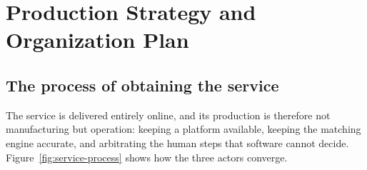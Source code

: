 \chapter{Production Strategy and Organization Plan}
\label{ch:organization}

\section{The process of obtaining the service}

The service is delivered entirely online, and its production is therefore not
manufacturing but operation: keeping a platform available, keeping the matching
engine accurate, and arbitrating the human steps that software cannot decide.
Figure~\ref{fig:service-process} shows how the three actors converge.

